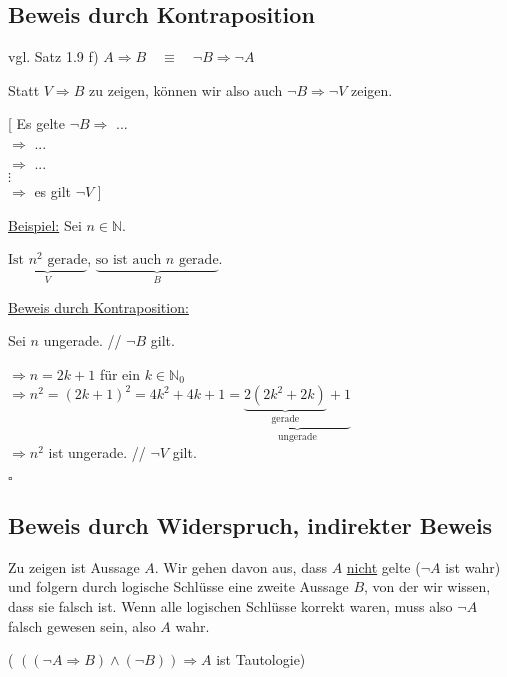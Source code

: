 \documentclass[a4paper, 12pt, twoside] {article}
\begin{document}
\subsection{Beweis durch Kontraposition} %

vgl. Satz 1.9 f) \qquad $A \Rightarrow B \quad \equiv \quad \neg B \Rightarrow \neg A$

Statt $V \Rightarrow B$ zu zeigen, können wir also auch $\neg B \Rightarrow \neg V$ zeigen.


[ Es gelte $\neg B \Rightarrow$ ... \\
\text{\qquad\qquad\qquad} $\Rightarrow$ ... \\
\text{\qquad\qquad\qquad} $\Rightarrow$ ... \\
\text{\qquad\qquad\qquad} \space $\vdots$ \\
\text{\qquad\qquad\qquad} $\Rightarrow$ es gilt $\neg V$ ]

\hfill

\underline{Beispiel:} Sei $n \in \mathbb{N}$.

$\underbrace{\text{Ist $n^2$ gerade}}_{V}$, $\underbrace{\text{so ist auch $n$ gerade}}_{B}$.

\hfill

\underline{Beweis durch Kontraposition:}

Sei $n$ ungerade. \hfill // $\neg B$ gilt.

$\Rightarrow n = 2k + 1$ für ein $k \in \mathbb{N}_0$ \\
$\Rightarrow n^2 = (2k+1)^2 = 4k^2+4k+1 = \underbrace{\underbrace{2(2k^2+2k)}_{\text{gerade}}+1}_{\text{ungerade}}$ \\
$\Rightarrow n^2$ ist ungerade. \hfill // $\neg V$ gilt.

\hfill $\square$

\subsection{Beweis durch Widerspruch, indirekter Beweis} %

Zu zeigen ist Aussage $A$. Wir gehen davon aus, dass $A$ \underline{nicht} gelte ($\neg A$ ist wahr) und folgern durch logische Schlüsse eine zweite Aussage $B$, von der wir wissen, dass sie falsch ist. Wenn alle logischen Schlüsse korrekt waren, muss also $\neg A$ falsch gewesen sein, also $A$ wahr.

( $((\neg A \Rightarrow B) \land (\neg B)) \Rightarrow A$ ist Tautologie)

\end{document}
